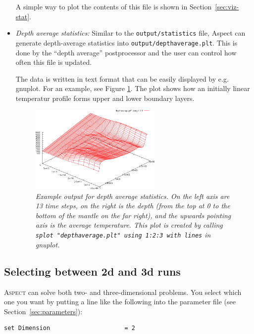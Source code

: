 \documentclass{article}
\newcommand{\aspect}{\textsc{Aspect}}
\begin{document}
\begin{itemize}
  A simple way to plot the contents of this file is shown in Section~\ref{sec:viz-stat}.

\item \textit{Depth average statistics:} Similar to the
  \texttt{output/statistics} file, Aspect can generate depth-average
  statistics into \texttt{output/depthaverage.plt}. This is done by the
  ``depth average'' postprocessor and the user can control how often this
  file is updated.

  The data is written in text format that can be easily displayed by
  e.g. gnuplot. For an example, see Figure \ref{fig:depthaverage}. The plot
  shows how an initially linear temperatur profile forms upper and lower
  boundary layers.

\begin{figure}[tbp]
  \centering
  \includegraphics[width=0.6\textwidth]{depthaverage2}
  \caption{\it Example output for depth average statistics. On the left axis are 13 time steps, on the right is the depth (from the top at 0 to the bottom of the mantle on the far right), and the upwards pointing axis is the average temperature. This plot is created by calling \texttt{splot "depthaverage.plt" using 1:2:3 with lines} in gnuplot.}
  \label{fig:depthaverage}
\end{figure}

\end{itemize}



\subsection{Selecting between 2d and 3d runs}
\label{sec:2d-vs-3d}

\aspect{} can solve both two- and three-dimensional problems. You
select which one you want by putting a line like the following into
the parameter file (see Section~\ref{sec:parameters}):
\begin{lstlisting}[frame=single,language=prmfile]
set Dimension                     = 2
\end{lstlisting}
\end{document}

